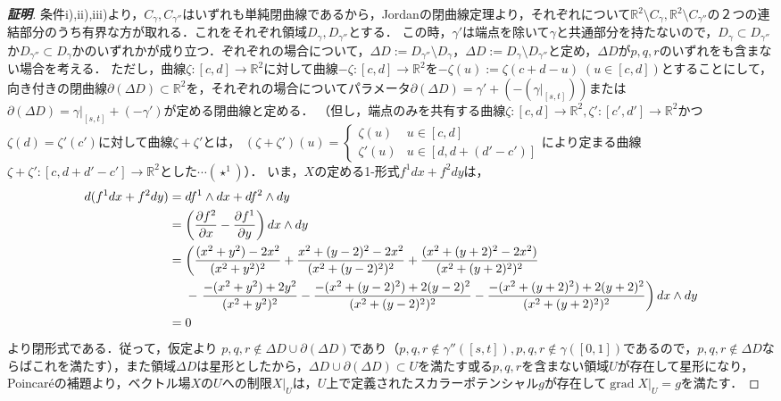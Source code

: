 \documentclass[dvipdfmx,a4paper,uplatex]{jsarticle}
\DeclareMathOperator{\grad}{\mathrm{grad}}
\begin{document}
\begin{proof}[\bf{証明}]
条件i),ii),iii)より，$C_\gamma,C_{\gamma''}$はいずれも単純閉曲線であるから，Jordanの閉曲線定理より，それぞれについて$\mathbb{R}^2\setminus C_\gamma,\mathbb{R}^2\setminus C_{\gamma''}$の２つの連結部分のうち有界な方が取れる．これをそれぞれ領域$D_\gamma,D_{\gamma''}$とする．
この時，$\gamma'$は端点を除いて$\gamma$と共通部分を持たないので，$D_\gamma\subset D_{\gamma''}$か$D_{\gamma''}\subset D_\gamma$かのいずれかが成り立つ．ぞれぞれの場合について，$\Delta D:=D_{\gamma''}\setminus D_\gamma$，$\Delta D:=D_\gamma\setminus D_{\gamma''}$と定め，$\Delta D$が$p,q,r$のいずれをも含まない場合を考える．
ただし，曲線$\zeta:[c,d]\to\mathbb{R}^2$に対して曲線$-\zeta:[c,d]\to\mathbb{R}^2$を$-\zeta(u):=\zeta(c+d-u)\;(u\in[c,d])$とすることにして，向き付きの閉曲線$\partial(\Delta D)\subset\mathbb{R}^2$を，それぞれの場合についてパラメータ$\partial(\Delta D)=\gamma'+(-(\gamma|_{[s,t]}))$または$\partial(\Delta D)=\gamma|_{[s,t]}+(-\gamma')$が定める閉曲線と定める．
（但し，端点のみを共有する曲線$\zeta:[c,d]\to\mathbb{R}^2,\zeta':[c',d']\to\mathbb{R}^2$かつ$\zeta(d)=\zeta'(c')$に対して曲線$\zeta+\zeta'$とは，
$(\zeta+\zeta')(u)=\begin{cases}
    \zeta(u) & u\in[c,d] \\
    \zeta'(u) & u\in[d,d+(d'-c')]
\end{cases}$により定まる曲線$\zeta+\zeta':[c,d+d'-c']\to\mathbb{R}^2$とした$\cdots(\star^1)$）．
いま，$X$の定める1-形式$f^1dx+f^2dy$は，
\begin{align*}
    d(f^1dx+f^2dy) &= df^1\wedge dx+df^2\wedge dy\\
    &= \left( \frac{\partial f^2}{\partial x}-\frac{\partial f^1}{\partial y} \right) dx\wedge dy \\
    &= \left( \frac{(x^2+y^2)-2x^2}{(x^2+y^2)^2} + \frac{x^2+(y-2)^2-2x^2}{(x^2+(y-2)^2)^2} + \frac{(x^2+(y+2)^2-2x^2)}{(x^2+(y+2)^2)^2}\right.\\*
    &\hphantom{{}={}}- \left. \frac{-(x^2+y^2)+2y^2}{(x^2+y^2)^2} - \frac{-(x^2+(y-2)^2)+2(y-2)^2}{(x^2+(y-2)^2)^2} - \frac{-(x^2+(y+2)^2)+2(y+2)^2}{(x^2+(y+2)^2)^2} \right) dx\wedge dy \\
    &= 0
\end{align*}
より閉形式である．従って，仮定より
$p,q,r\notin \Delta D\cup\partial(\Delta D)$であり（$p,q,r\notin\gamma''([s,t]),p,q,r\notin\gamma([0,1])$であるので，$p,q,r\notin \Delta D$ならばこれを満たす），また領域$\Delta D$は星形としたから，$\Delta D\cup\partial(\Delta D)\subset U$を満たす或る$p,q,r$を含まない領域$U$が存在して星形になり，Poincaréの補題より，ベクトル場$X$の$U$への制限$X|_U$は，$U$上で定義されたスカラーポテンシャル$g$が存在して$\grad X|_U=g$を満たす．

\end{proof}
\end{document}
